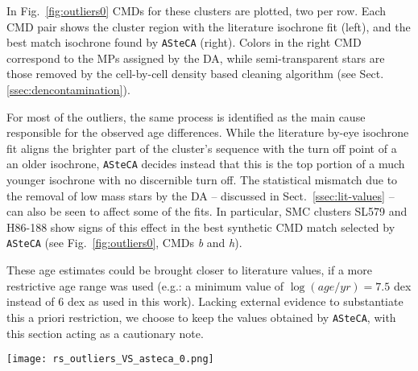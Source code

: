 \documentclass{aa}
\begin{document}
\begin{appendix}
In Fig.~\ref{fig:outliers0} CMDs for these clusters are plotted, two per row.
Each CMD pair shows the cluster region with the literature isochrone fit (left),
and the best match isochrone found by \texttt{ASteCA} (right).
%
Colors in the right CMD correspond to the MPs assigned by the DA, while
semi-transparent stars are those removed by the cell-by-cell density based
cleaning algorithm (see Sect.\ref{ssec:dencontamination}).
%

For most of the outliers, the same process is identified as the main
cause responsible for the observed age differences.
While the literature by-eye isochrone fit aligns the brighter
part of the cluster's sequence with the turn off point of a an older
isochrone, \texttt{ASteCA} decides instead that this is the top portion of a
much younger isochrone with no discernible turn off.
%
The statistical mismatch due to the removal of low mass stars by the DA
-- discussed in Sect.~\ref{ssec:lit-values} -- can also be seen to affect some
of the fits. In particular, SMC clusters SL579 and H86-188 show signs of
this effect in the best synthetic CMD match selected by \texttt{ASteCA}
(see Fig.~\ref{fig:outliers0}, CMDs \emph{b} and \emph{h}).

These age estimates could be brought closer to literature values, if a more
restrictive age range was used (e.g.: a minimum value of $\log(age/yr){=}7.5$
dex instead of 6 dex as used in this work).
Lacking external evidence to substantiate this a priori restriction, we choose
to keep the values obtained by \texttt{ASteCA}, with this section acting as a
cautionary note.

\begin{figure*}
\texttt{[image: rs\_outliers\_VS\_asteca\_0.png]}
\caption{CMDs for the outliers set. Description of the plots in the main
text of the section.}
\label{fig:outliers0}
\end{figure*}






\end{appendix}
\end{document}
